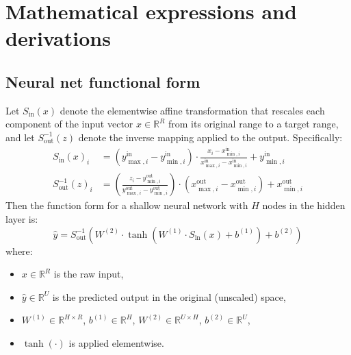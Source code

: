 \documentclass[a4paper,12pt]{article}
\begin{document}
\clearpage
\appendix

{\centering {} \par}

\setcounter{page}{1}
\setcounter{equation}{0} 

\section{Mathematical expressions and derivations}
\label{app:maths}

\subsection{Neural net functional form}

Let \( S_{\text{in}}(x) \) denote the elementwise affine transformation that rescales each component of the input vector \( x \in \mathbb{R}^R \) from its original range to a target range, and let \( S_{\text{out}}^{-1}(z) \) denote the inverse mapping applied to the output. Specifically:
\begin{align*}
S_{\text{in}}(x)_i &= (y_{\max,i}^{\text{in}} - y_{\min,i}^{\text{in}}) \cdot \frac{x_i - x_{\min,i}^{\text{in}}}{x_{\max,i}^{\text{in}} - x_{\min,i}^{\text{in}}} + y_{\min,i}^{\text{in}} \\
S_{\text{out}}^{-1}(z)_i &= \left( \frac{z_i - y_{\min,i}^{\text{out}}}{y_{\max,i}^{\text{out}} - y_{\min,i}^{\text{out}}} \right) \cdot (x_{\max,i}^{\text{out}} - x_{\min,i}^{\text{out}}) + x_{\min,i}^{\text{out}}
\end{align*}
Then the function form for a shallow neural network with $H$ nodes in the hidden layer is:
\[
\hat{y} = S_{\text{out}}^{-1} \left( W^{(2)} \cdot \tanh\left( W^{(1)} \cdot S_{\text{in}}(x) + b^{(1)} \right) + b^{(2)} \right)
\]
where:
\begin{itemize}
  \item \( x \in \mathbb{R}^R \) is the raw input,
  \item \( \hat{y} \in \mathbb{R}^U \) is the predicted output in the original (unscaled) space,
  \item \( W^{(1)} \in \mathbb{R}^{H \times R} \), \( b^{(1)} \in \mathbb{R}^H \), \( W^{(2)} \in \mathbb{R}^{U \times H} \), \( b^{(2)} \in \mathbb{R}^U \),
  \item \( \tanh(\cdot) \) is applied elementwise.
\end{itemize}
\end{document}
